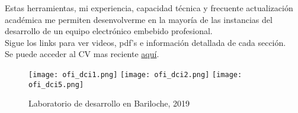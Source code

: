 Estas herramientas, mi experiencia, capacidad técnica y frecuente actualización académica me
permiten desenvolverme en la mayoría de las instancias del desarrollo de un
equipo electrónico embebido profesional.\\
Sigue los links para ver videos, pdf's e información detallada de cada sección.\\
Se puede acceder al CV mas reciente \href{\linkgithubcvpdf}{aquí}.\\
  \begin{figure}
      \begin{center}
         \texttt{[image: ofi\_dci1.png]}
         \texttt{[image: ofi\_dci2.png]}
         \texttt{[image: ofi\_dci5.png]}
      \end{center}
      \caption{Laboratorio de desarrollo en Bariloche, 2019}
      \label{fig:ofi_dci}
   \end{figure}
\pagebreak

